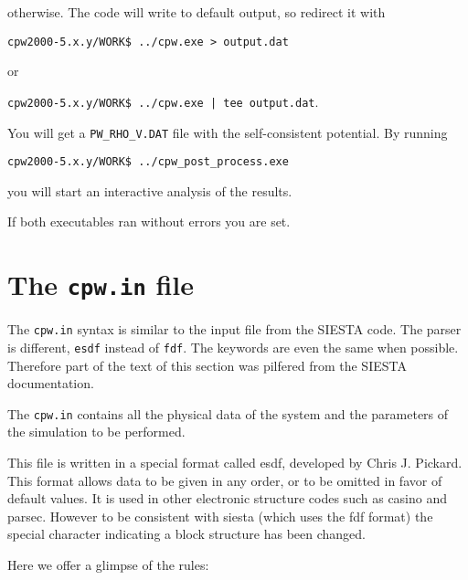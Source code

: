 \documentclass[11pt]{article}
\begin{document}
otherwise.   The code will write to default output, so redirect it with

\noindent\texttt{cpw2000-5.x.y/WORK\$ ../cpw.exe > output.dat}

or

\noindent\texttt{cpw2000-5.x.y/WORK\$ ../cpw.exe | tee output.dat}.

You will get a \texttt{PW{\_}RHO{\_}V.DAT} file with the self-consistent potential.  By running

\noindent\texttt{cpw2000-5.x.y/WORK\$ ../cpw{\_}post{\_}process.exe}

you will start an interactive analysis of the results.

If both executables ran without errors you are set.

\section{The \texttt{cpw.in} file}

The \texttt{cpw.in} syntax is similar to the input file from the SIESTA code.
The parser is different, \texttt{esdf} instead of \texttt{fdf}.  The keywords
are even the same when possible.  Therefore part of the text of this section
was pilfered from the SIESTA documentation.

The \texttt{cpw.in}
contains all the physical data of the system and the parameters of
the simulation to be performed.

This file is written in a special format called {\sc esdf}, developed by
Chris J. Pickard. This format allows data to be
given in any order, or to be omitted in favor of default values.
It is used in other electronic structure codes such as {\sc casino} and
{\sc parsec}.   However to be consistent with {\sc siesta} (which uses the fdf format) the special character
indicating a block structure has been changed.

Here we offer a glimpse of the rules:
\end{document}
